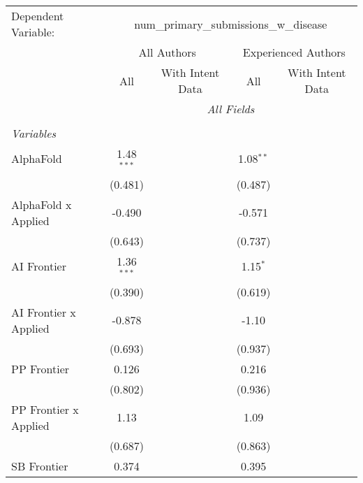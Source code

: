 \begingroup
\centering
\begin{tabular}{lcccccc}
   \tabularnewline \midrule \midrule
   Dependent Variable: & \multicolumn{6}{c}{num\_primary\_submissions\_w\_disease}\\
 & \multicolumn{3}{c}{All Authors} & \multicolumn{3}{c}{Experienced Authors} \\
\cmidrule(lr){2-4} \cmidrule(lr){5-7}
 & \multicolumn{1}{c}{All} & \multicolumn{2}{c}{With Intent Data} & \multicolumn{1}{c}{All} & \multicolumn{2}{c}{With Intent Data} \\
\cmidrule(lr){2-2} \cmidrule(lr){3-4} \cmidrule(lr){5-5} \cmidrule(lr){6-7}
 & \multicolumn{6}{c}{\textit{All Fields}} \\ \\
   \emph{Variables}\\
   AlphaFold             & 1.48$^{***}$ &           &           & 1.08$^{**}$ &         &   \\   
                         & (0.481)      &           &           & (0.487)     &         &   \\   
   AlphaFold x Applied   & -0.490       &           &           & -0.571      &         &   \\   
                         & (0.643)      &           &           & (0.737)     &         &   \\   
   AI Frontier           & 1.36$^{***}$ &           &           & 1.15$^{*}$  &         &   \\   
                         & (0.390)      &           &           & (0.619)     &         &   \\   
   AI Frontier x Applied & -0.878       &           &           & -1.10       &         &   \\   
                         & (0.693)      &           &           & (0.937)     &         &   \\   
   PP Frontier           & 0.126        &           &           & 0.216       &         &   \\   
                         & (0.802)      &           &           & (0.936)     &         &   \\   
   PP Frontier x Applied & 1.13         &           &           & 1.09        &         &   \\   
                         & (0.687)      &           &           & (0.863)     &         &   \\   
   SB Frontier           & 0.374        &           &           & 0.395       &         &   \\   

\end{tabular}
